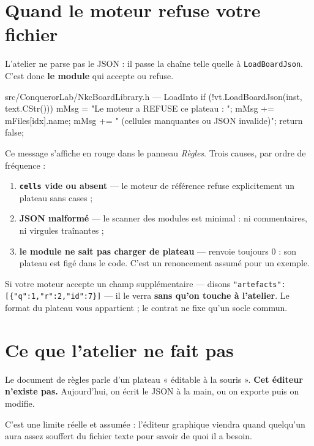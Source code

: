 \section{Quand le moteur refuse votre fichier}

L'atelier ne parse pas le JSON : il passe la chaîne telle quelle à
\texttt{LoadBoardJson}. C'est donc \textbf{le module} qui accepte ou refuse.

\begin{nkcode}{src/ConquerorLab/NkcBoardLibrary.h — LoadInto}
if (!vt.LoadBoardJson(inst, text.CStr())) {
    mMsg  = "Le moteur a REFUSE ce plateau : ";
    mMsg += mFiles[idx].name;
    mMsg += "  (cellules manquantes ou JSON invalide)";
    return false;
}
\end{nkcode}

Ce message s'affiche en rouge dans le panneau \emph{Règles}. Trois causes, par
ordre de fréquence :

\begin{enumerate}
  \item \textbf{\texttt{cells} vide ou absent} — le moteur de référence refuse
        explicitement un plateau sans cases ;
  \item \textbf{JSON malformé} — le scanner des modules est minimal : ni
        commentaires, ni virgules traînantes ;
  \item \textbf{le module ne sait pas charger de plateau} —
         renvoie toujours 0 : son plateau est figé dans
        le code. C'est un renoncement assumé pour un exemple.
\end{enumerate}

\begin{nkretenir}
Si votre moteur accepte un champ supplémentaire — disons
\texttt{"artefacts":[\{"q":1,"r":2,"id":7\}]} — il le verra \textbf{sans qu'on
touche à l'atelier}. Le format du plateau vous appartient ; le contrat ne fixe
qu'un socle commun.
\end{nkretenir}

\section{Ce que l'atelier ne fait pas}

Le document de règles parle d'un plateau « éditable à la souris ». \textbf{Cet
éditeur n'existe pas.} Aujourd'hui, on écrit le JSON à la main, ou on exporte puis
on modifie.

C'est une limite réelle et assumée : l'éditeur graphique viendra quand quelqu'un
aura assez souffert du fichier texte pour savoir de quoi il a besoin.


